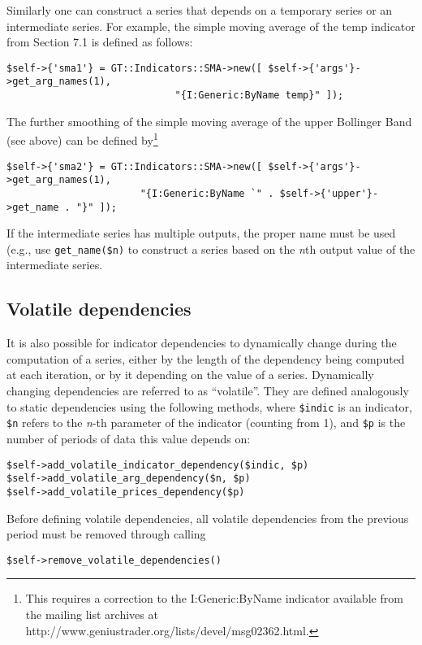 \documentclass[11pt,twoside]{article}
\begin{document}
Similarly one can construct a series that depends on a temporary series
or an intermediate series. For example, the simple moving average of the
temp indicator from Section 7.1 is defined as follows:
\begin{lstlisting}[numbers=none]
$self->{'sma1'} = GT::Indicators::SMA->new([ $self->{'args'}->get_arg_names(1),
                             "{I:Generic:ByName temp}" ]);
\end{lstlisting}
The further smoothing of the simple moving average of the upper Bollinger
Band (see above) can be defined by\footnote{This requires a correction 
to the I:Generic:ByName indicator available from the mailing list archives 
at http://www.geniustrader.org/lists/devel/msg02362.html.}
\begin{lstlisting}[numbers=none]
$self->{'sma2'} = GT::Indicators::SMA->new([ $self->{'args'}->get_arg_names(1),
                       "{I:Generic:ByName `" . $self->{'upper'}->get_name . "}" ]);
\end{lstlisting}
If the intermediate series has multiple outputs, the proper name must be used
(e.g., use \lstinline!get_name($n)! to construct a series based on the 
{\em n}th output value of the intermediate series.

\subsection[Volatile dependencies]{\label{bkm:Ref192505424}Volatile
dependencies}
It is also possible for indicator dependencies to dynamically change
during the computation of a series, either by the length of the
dependency being computed at each iteration, or by it depending on the
value of a series. Dynamically changing dependencies are referred to as
``volatile''. They are defined analogously to static dependencies using
the following methods, where \lstinline!$indic! is an
indicator, \lstinline!$n! refers to the \textit{n}-th
parameter of the indicator (counting from 1), and
\lstinline!$p! is the number of periods of data this value
depends on:
\begin{lstlisting}[numbers=none]
$self->add_volatile_indicator_dependency($indic, $p)
$self->add_volatile_arg_dependency($n, $p)
$self->add_volatile_prices_dependency($p)
\end{lstlisting}

Before defining volatile dependencies, all volatile dependencies from
the previous period must be removed through calling
\begin{lstlisting}[numbers=none]
$self->remove_volatile_dependencies()
\end{lstlisting}
\end{document}
